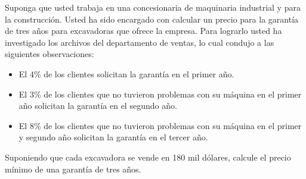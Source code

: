 \documentclass[ a4paper, twoside, 11pt]{article}
\begin{document}
\begin{problem}
Suponga que usted trabaja en una concesionaria de maquinaria industrial y para la construcci\'on. Usted ha sido encargado con calcular un precio para la garant\'ia de tres a\~nos para excavadoras que ofrece la empresa. Para lograrlo usted ha investigado los archivos del departamento de ventas, lo cual condujo a las siguientes observaciones: 
\begin{itemize}
\item El 4\% de los clientes solicitan la garant\'ia en el primer a\~no. 
\item El 3\% de los clientes que no tuvieron problemas con su m\'aquina en el primer a\~no solicitan la garant\'ia en el segundo a\~no. 
\item El 8\% de los clientes que no tuvieron problemas con su m\'aquina en el primer y segundo a\~no solicitan la garant\'ia en el tercer a\~no. 
\end{itemize}

Suponiendo que cada excavadora se vende en 180 mil d\'olares, calcule el precio m\'inimo de una garant\'ia de tres a\~nos. 

\end{problem}
\vspace{\baselineskip}
\end{document}
